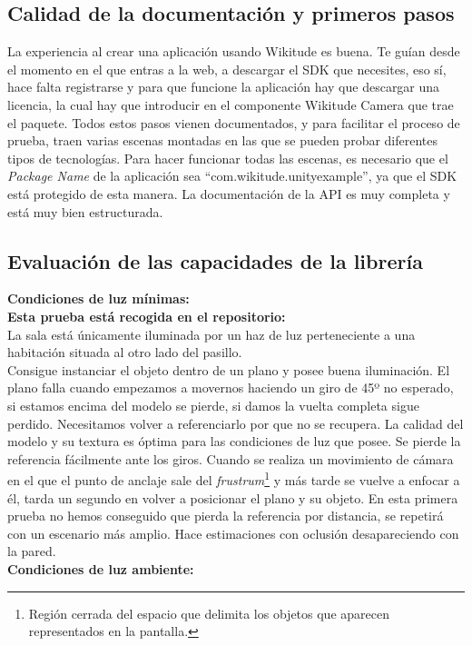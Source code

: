\subsection{Calidad de la documentación y primeros pasos}
La experiencia al crear una aplicación usando Wikitude es buena. Te guían desde el momento en el que entras a la web, a descargar el SDK que necesites, eso sí, hace falta registrarse y para que funcione la aplicación hay que descargar una licencia, la cual hay que introducir en el componente Wikitude Camera que trae el paquete. Todos estos pasos vienen documentados, y para facilitar el proceso de prueba, traen varias escenas montadas en las que se pueden probar diferentes tipos de tecnologías. Para hacer funcionar todas las escenas, es necesario que el \textit{Package Name} de la aplicación sea ``com.wikitude.unityexample'', ya que el SDK está protegido de esta manera. La documentación de la API es muy completa y está muy bien estructurada.\cite{WikitudeDoc}
\subsection{Evaluación de las capacidades de la librería}
\textbf{Condiciones de luz mínimas:}\\
\textbf{Esta prueba está recogida en el repositorio:}\\
La sala está únicamente iluminada por un haz de luz perteneciente a una habitación situada al otro lado del pasillo.\\

Consigue instanciar el objeto dentro de un plano y posee buena iluminación. El plano falla cuando empezamos a movernos haciendo un giro de 45º no esperado, si estamos encima del modelo se pierde, si damos la vuelta completa sigue perdido. Necesitamos volver a referenciarlo por que no se recupera. La calidad del modelo y su textura es óptima para las condiciones de luz que posee. Se pierde la referencia fácilmente ante los giros. Cuando se realiza un movimiento de cámara en el que el punto de anclaje sale del \textit{frustrum}\footnote{Región cerrada del espacio que delimita los objetos que aparecen representados en la pantalla.}  y más tarde se vuelve a enfocar a él, tarda un segundo en volver a posicionar el plano y su objeto. En esta primera prueba no hemos conseguido que pierda la referencia por distancia, se repetirá con un escenario más amplio. Hace estimaciones con oclusión desapareciendo con la pared.\\

\textbf{Condiciones de luz ambiente:}

